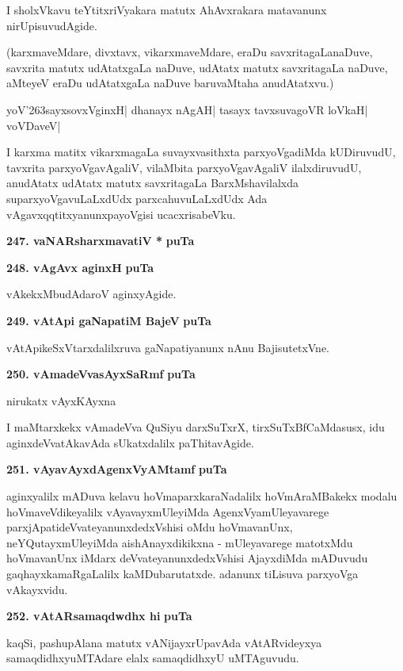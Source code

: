 I sholxVkavu teYtitxriVyakara matutx AhAvxrakara matavanunx nirUpisuvudAgide.

(karxmaveMdare, divxtavx, vikarxmaveMdare, eraDu savxritagaLanaDuve, savxrita matutx udAtatxgaLa naDuve, udAtatx matutx savxritagaLa naDuve, aMteyeV eraDu udAtatxgaLa naDuve baruvaMtaha anudAtatxvu.)

\begin{shloka}
yoV\char'263sayxsovxVginxH| dhanayx nAgAH| tasayx tavxsuvagoVR loVkaH| voVDaveV|
\end{shloka}

I karxma matitx vikarxmagaLa suvayxvasithxta parxyoVgadiMda kUDiruvudU, tavxrita parxyoVgavAgaliV, vilaM\-bita parxyoVgavAgaliV ilalxdiruvudU, anudAtatx udAtatx matutx savxritagaLa BarxMshavilalxda suparx\-yoVga\-vuLaLxdUdx parxcahuvuLaLxdUdx Ada vAgavxqqtitxyanunxpayoVgisi ucacxrisabeVku.

\medskip
\noindent
\textbf{247. vaNARsharxmavatiV *} \hfill{\bf puTa \pageref{95}}

\medskip
\noindent
\textbf{248. vAgAvx aginxH} \hfill{\bf puTa \pageref{212}}

\smallskip
vAkekxMbudAdaroV aginxyAgide.

\medskip
\noindent
\textbf{249. vAtApi gaNapatiM BajeV} \hfill{\bf puTa \pageref{124}}

\smallskip
vAtApikeSxVtarxdalilxruva gaNapatiyanunx nAnu BajisutetxVne.

\medskip
\noindent
\textbf{250. vAmadeVvasAyxSaRmf} \hfill{\bf puTa \pageref{112}}

\hfill{nirukatx vAyxKAyxna}

\smallskip
I maMtarxkekx vAmadeVva QuSiyu darxSuTxrX, tirxSuTxBfCaMdasusx, idu aginx\-deVvatAkavAda sUkatxdalilx paThita\-vAgide.

\medskip
\noindent
\textbf{251. vAyavAyxdAgenxVyAMtamf} \hfill{\bf puTa \pageref{208}}

\smallskip
aginxyalilx mADuva kelavu hoVmaparxkaraNadalilx hoVmAraMBakekx modalu hoVmaveVdikeyalilx vAyavayxmUleyiMda AgenxVyamUleyavarege parxjA\-patideVvateyanunxdedxVshisi oMdu hoVmavanUnx, neYQutayxmUleyiMda aishAnayxdikikxna - mUleyavarege matotxMdu hoVmavanUnx iMdarx deVvate\-yanunxdedxVshisi AjayxdiMda mADuvudu gaqhayxkamaRgaLalilx kaMDubarutatxde. adanunx tiLisuva parxyoVga vAkayx\-vidu.

\medskip
\noindent
\textbf{252. vAtARsamaqdwdhx hi} \hfill{\bf puTa \pageref{90}}

\smallskip
kaqSi, pashupAlana matutx vANijayxrUpavAda vAtARvideyxya samaqdidhx\-yuMTAdare elalx samaq\-didhxyU uMTAguvudu.

